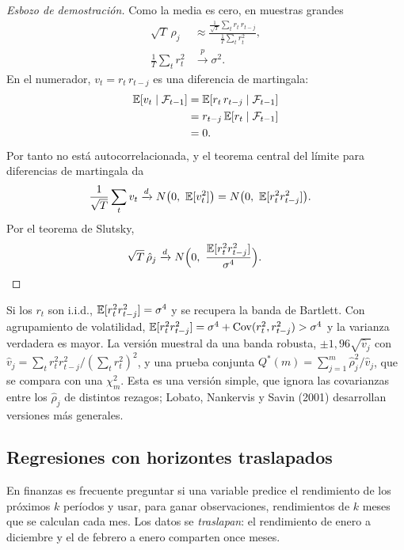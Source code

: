 \begin{proof}[Esbozo de demostración]
Como la media es cero, en muestras grandes
\begin{align*}
  \sqrt T\,\hat\rho_j &\approx \frac{\frac{1}{\sqrt T}\sum_tr_t\,r_{t-j}}{\frac1T\sum_tr_t^2},\\
  \frac1T\sum_tr_t^2  &\xrightarrow{p}\sigma^2 .
\end{align*}
En el numerador, $v_t=r_t\,r_{t-j}$ es una diferencia de martingala:
\begin{align*}
  \mathbb{E}[v_t\mid\mathcal F_{t-1}] &= \mathbb{E}[r_t\,r_{t-j}\mid\mathcal F_{t-1}]\\
                              &= r_{t-j}\,\mathbb{E}[r_t\mid\mathcal F_{t-1}]\\
                              &= 0 .
\end{align*}
Por tanto no está autocorrelacionada, y el teorema central del límite para diferencias de martingala da
\begin{align*}
  \frac1{\sqrt T}\sum_tv_t &\xrightarrow{d}N\bigl(0,\ \E[v_t^2]\bigr) = N\bigl(0,\ \E[r_t^2r_{t-j}^2]\bigr).
\end{align*}
Por el teorema de Slutsky,
\begin{align*}
  \sqrt T\,\hat\rho_j &\xrightarrow{d} N\Bigl(0,\ \frac{\E[r_t^2r_{t-j}^2]}{\sigma^4}\Bigr). && \qedhere
\end{align*}
\end{proof}

Si los $r_t$ son i.i.d., $\mathbb{E}[r_t^2r_{t-j}^2]=\sigma^4$ y se recupera la banda de Bartlett. Con agrupamiento de
volatilidad, $\mathbb{E}[r_t^2r_{t-j}^2]=\sigma^4+\operatorname{Cov}(r_t^2,r_{t-j}^2)>\sigma^4$ y la varianza verdadera es mayor. La
versión muestral da una banda robusta, $\pm1{,}96\sqrt{\hat v_j}$ con
$\hat v_j=\sum_tr_t^2r_{t-j}^2/(\sum_tr_t^2)^2$, y una prueba conjunta $Q^*(m)=\sum_{j=1}^m\hat\rho_j^2/\hat v_j$,
que se compara con una $\chi^2_m$. Esta es una versión simple, que ignora las covarianzas entre los $\hat\rho_j$
de distintos rezagos; Lobato, Nankervis y Savin (2001) desarrollan versiones más generales.

\subsection{Regresiones con horizontes traslapados}

En finanzas es frecuente preguntar si una variable predice el rendimiento de los próximos $k$ períodos y
usar, para ganar observaciones, rendimientos de $k$ meses que se calculan cada mes. Los datos se
\emph{traslapan}: el rendimiento de enero a diciembre y el de febrero a enero comparten once meses.

